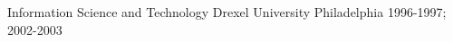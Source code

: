 


\begin{cventries}


\cventry
{Information Science and Technology} %
{Drexel University} %
{Philadelphia} %
{1996-1997; 2002-2003} %
{ %
\begin{cvitems}
\end{cvitems}
}


\end{cventries}